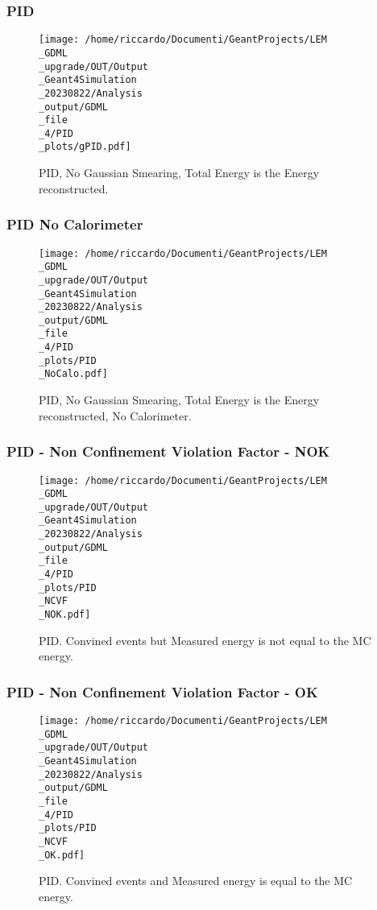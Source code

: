 \documentclass[8pt]{beamer}
\begin{document}
            \begin{frame}
                \frametitle{PID}
            
        \begin{figure}[h]
            \centering
            \texttt{[image: /home/riccardo/Documenti/GeantProjects/LEM\\\_GDML\\\_upgrade/OUT/Output\\\_Geant4Simulation\\\_20230822/Analysis\\\_output/GDML\\\_file\\\_4/PID\\\_plots/gPID.pdf]}
            \caption{PID, No Gaussian Smearing, Total Energy is the Energy reconstructed.}
        \end{figure}
        
            \end{frame}
            
            \begin{frame}
                \frametitle{PID No Calorimeter}
            
        \begin{figure}[h]
            \centering
            \texttt{[image: /home/riccardo/Documenti/GeantProjects/LEM\\\_GDML\\\_upgrade/OUT/Output\\\_Geant4Simulation\\\_20230822/Analysis\\\_output/GDML\\\_file\\\_4/PID\\\_plots/PID\\\_NoCalo.pdf]}
            \caption{PID, No Gaussian Smearing, Total Energy is the Energy reconstructed, No Calorimeter.}
        \end{figure}
        
            \end{frame}
            
            \begin{frame}
                \frametitle{PID - Non Confinement Violation Factor - NOK}
            
        \begin{figure}[h]
            \centering
            \texttt{[image: /home/riccardo/Documenti/GeantProjects/LEM\\\_GDML\\\_upgrade/OUT/Output\\\_Geant4Simulation\\\_20230822/Analysis\\\_output/GDML\\\_file\\\_4/PID\\\_plots/PID\\\_NCVF\\\_NOK.pdf]}
            \caption{PID. Convined events but Measured energy is not equal to the MC energy.}
        \end{figure}
        
            \end{frame}
            
            \begin{frame}
                \frametitle{PID - Non Confinement Violation Factor - OK}
            
        \begin{figure}[h]
            \centering
            \texttt{[image: /home/riccardo/Documenti/GeantProjects/LEM\\\_GDML\\\_upgrade/OUT/Output\\\_Geant4Simulation\\\_20230822/Analysis\\\_output/GDML\\\_file\\\_4/PID\\\_plots/PID\\\_NCVF\\\_OK.pdf]}
            \caption{PID. Convined events and Measured energy is equal to the MC energy.}
        \end{figure}
        
            \end{frame}
            
\end{document}
